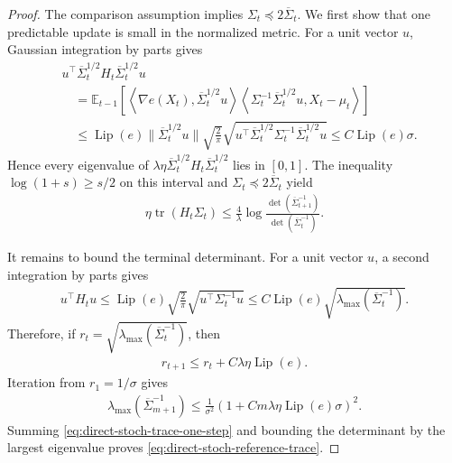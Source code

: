 \documentclass{article}
\theoremstyle{plain}
\theoremstyle{definition}
\theoremstyle{plain}
\newcommand{\tr}{\operatorname{tr}}
\newcommand{\E}{\mathbb E}
\begin{document}
\begin{proof}
    The comparison assumption implies
    $\Sigma_t\preceq2\overline\Sigma_t$.  We first show that one
    predictable update is small in the normalized metric.  For a unit
    vector $u$, Gaussian integration by parts gives
    \begin{align}
         & u^\top\overline\Sigma_t^{1/2}H_t
        \overline\Sigma_t^{1/2}u
        \\
         & \quad=
        \E_{t-1}\left[
            \left\langle
            \nabla e(X_t),\overline\Sigma_t^{1/2}u
            \right\rangle
            \left\langle
            \Sigma_t^{-1}\overline\Sigma_t^{1/2}u,
            X_t-\mu_t
            \right\rangle
            \right]
        \\
         & \quad\leq
        \operatorname{Lip}(e)
        \|\overline\Sigma_t^{1/2}u\|
        \sqrt{\frac2\pi}
        \sqrt{
            u^\top\overline\Sigma_t^{1/2}
            \Sigma_t^{-1}\overline\Sigma_t^{1/2}u
        }
        \leq C\operatorname{Lip}(e)\sigma.
    \end{align}
    Hence every eigenvalue of
    $\lambda\eta\overline\Sigma_t^{1/2}H_t
        \overline\Sigma_t^{1/2}$ lies in $[0,1]$.  The inequality
    $\log(1+s)\geq s/2$ on this interval and
    $\Sigma_t\preceq2\overline\Sigma_t$ yield
    \begin{align}
        \eta\tr(H_t\Sigma_t)
        \leq
        \frac{4}{\lambda}
        \log\frac{\det(\overline\Sigma_{t+1}^{-1})}
        {\det(\overline\Sigma_t^{-1})}.
        \label{eq:direct-stoch-trace-one-step}
    \end{align}

    It remains to bound the terminal determinant.  For a unit vector
    $u$, a second integration by parts gives
    \begin{align}
        u^\top H_tu
        \leq
        \operatorname{Lip}(e)\sqrt{\frac2\pi}
        \sqrt{u^\top\Sigma_t^{-1}u}
        \leq
        C\operatorname{Lip}(e)
        \sqrt{\lambda_{\max}(\overline\Sigma_t^{-1})}.
    \end{align}
    Therefore, if
    $r_t=\sqrt{\lambda_{\max}(\overline\Sigma_t^{-1})}$, then
    \begin{align}
        r_{t+1}\leq r_t+C\lambda\eta\operatorname{Lip}(e).
    \end{align}
    Iteration from $r_1=1/\sigma$ gives
    \begin{align}
        \lambda_{\max}(\overline\Sigma_{m+1}^{-1})
        \leq
        \frac1{\sigma^2}
        \left(
        1+Cm\lambda\eta\operatorname{Lip}(e)\sigma
        \right)^2.
    \end{align}
    Summing \eqref{eq:direct-stoch-trace-one-step} and bounding the
    determinant by the largest eigenvalue proves
    \eqref{eq:direct-stoch-reference-trace}.
\end{proof}
\end{document}
